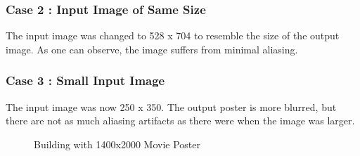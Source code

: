 \documentclass{article}
\newif\ifblackandwhitecycle
\gdef\patternnumber{0}
\gdef\patternnumber{1}
\gdef\patternnumber{1}
\gdef\patternnumber{0}
\gdef\columncount{1}
\gdef\rowcount{1}
\newcommand\zoombox[2][]{
    \begin{scope}[zoombox paths]
        \pgfmathsetmacro\xpos{
            (\columncount-1)*(\imagewidth / \pgfkeysvalueof{/tikz/zoomboxarray columns} + \pgfkeysvalueof{/tikz/zoomboxarray inner gap} / \pgfkeysvalueof{/tikz/zoomboxarray columns} ) + \pgflinewidth
        }
        \pgfmathsetmacro\ypos{
            (\rowcount-1)*( \imageheight / \pgfkeysvalueof{/tikz/zoomboxarray rows} + \pgfkeysvalueof{/tikz/zoomboxarray inner gap} / \pgfkeysvalueof{/tikz/zoomboxarray rows} ) + 0.5*\pgflinewidth
        }
        \edef\dospy{\noexpand\spy [
            #1,
            zoombox paths/.append style={
                black and white pattern=\patternnumber
            },
            every spy on node/.append style={#1},
            x=\imagewidth,
            y=\imageheight
        ] on (#2) in node [anchor=north west] at ($(zoomboxes container.north west)+(\xpos pt,-\ypos pt)$);}
        \dospy
        \pgfmathtruncatemacro\pgfmathresult{ifthenelse(\columncount==\pgfkeysvalueof{/tikz/zoomboxarray columns},\rowcount+1,\rowcount)}
        \global\let\rowcount=\pgfmathresult
        \pgfmathtruncatemacro\pgfmathresult{ifthenelse(\columncount==\pgfkeysvalueof{/tikz/zoomboxarray columns},1,\columncount+1)}
        \global\let\columncount=\pgfmathresult
        \ifblackandwhitecycle
            \pgfmathtruncatemacro{\newpatternnumber}{\patternnumber+1}
            \global\edef\patternnumber{\newpatternnumber}
        \fi
    \end{scope}
}
\begin{document}
\subsubsection{Case 2 : Input Image of Same Size}
The input image was changed to 528 x 704 to resemble the size of the output image.
As one can observe, the image suffers from minimal aliasing. 

\subsubsection{Case 3 : Small Input Image}
The input image was now 250 x 350. The output poster is more blurred, but there are not as much aliasing 
artifacts as there were when the image was larger.

\begin{figure}[H]\centering
    \caption{Building with 1400x2000 Movie Poster}
    \end{figure}
\end{document}
